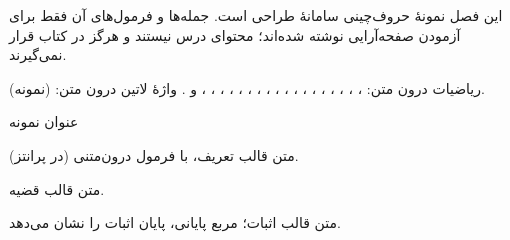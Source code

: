 
این فصل نمونهٔ حروف‌چینی سامانهٔ طراحی است. جمله‌ها و فرمول‌های آن فقط برای آزمودن صفحه‌آرایی نوشته شده‌اند؛ محتوای درس نیستند و هرگز در کتاب قرار نمی‌گیرند.

ریاضیات درون متن: ، ، ، ، \ELim{\theta}، \ELim{\phi}، \ELim{\rho}، ، ، ، ، ، \ELim{\sin\theta}، \ELim{\cos\phi}، ، ، ، ،  و . واژهٔ لاتین درون متن:  (نمونه).

\ELhold


\begin{ELunit}




\end{ELunit}

\ELhold


\begin{ELdefinition}{عنوان نمونه}

متن قالب تعریف، با فرمول درون‌متنی  (در پرانتز).

\end{ELdefinition}

\begin{ELtheorem}{}

متن قالب قضیه.

\end{ELtheorem}

\begin{ELproof}{}

متن قالب اثبات؛ مربع پایانی، پایان اثبات را نشان می‌دهد.

\end{ELproof}

